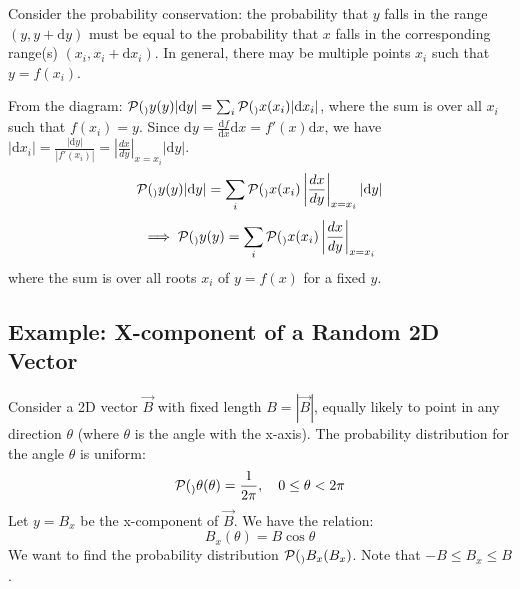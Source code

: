 \documentclass[11pt]{article}
\newcommand{\ProbDens}[1]{\mathcal{P}(#1)} %
\newcommand{\dd}[1]{\mathrm{d}#1} %
\newcommand{\deriv}[2]{\frac{\mathrm{d} #1}{\mathrm{d} #2}}
\begin{document}
Consider the probability conservation: the probability that $y$ falls in the range $(y, y+\dd{y})$ must be equal to the probability that $x$ falls in the corresponding range(s) $(x_i, x_i+\dd{x}_i)$.
In general, there may be multiple points $x_i$ such that $y = f(x_i)$.



From the diagram: $\ProbDens_y(y) |\dd{y}| = \sum_i \ProbDens_x(x_i) |\dd{x}_i|$, where the sum is over all $x_i$ such that $f(x_i)=y$.
Since $\dd{y} = \deriv{f}{x} \dd{x} = f'(x) \dd{x}$, we have $|\dd{x}_i| = \frac{|\dd{y}|}{|f'(x_i)|} = |\frac{dx}{dy}|_{x=x_i} |\dd{y}|$.
\[ \ProbDens_y(y) |\dd{y}| = \sum_i \ProbDens_x(x_i) \left| \frac{dx}{dy} \right|_{x=x_i} |\dd{y}| \]
\[ \implies \ProbDens_y(y) = \sum_i \ProbDens_x(x_i) \left| \frac{dx}{dy} \right|_{x=x_i} \]
where the sum is over all roots $x_i$ of $y=f(x)$ for a fixed $y$.

\subsection*{Example: X-component of a Random 2D Vector}

Consider a 2D vector $\vec{B}$ with fixed length $B=|\vec{B}|$, equally likely to point in any direction $\theta$ (where $\theta$ is the angle with the x-axis).
The probability distribution for the angle $\theta$ is uniform:
\[ \ProbDens_\theta(\theta) = \frac{1}{2\pi}, \quad 0 \le \theta < 2\pi \]
Let $y = B_x$ be the x-component of $\vec{B}$. We have the relation:
\[ B_x(\theta) = B \cos \theta \]
We want to find the probability distribution $\ProbDens_{B_x}(B_x)$. Note that $-B \le B_x \le B$.

\begin{center}
\end{center}
\end{document}
